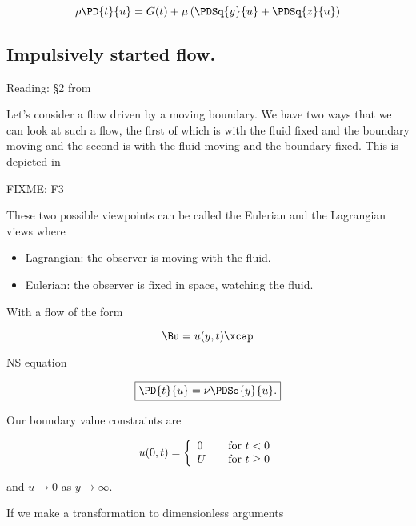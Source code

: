 \begin{equation}\label{eqn:continuumL16:210}
\rho \PD{t}{u} = G(t) + \mu \left( \PDSq{y}{u} +\PDSq{z}{u} \right)
\end{equation}

\subsection{Impulsively started flow.}

Reading: \S 2 from \cite{acheson1990elementary}

Let's consider a flow driven by a moving boundary.  We have two ways that we can look at such a flow, the first of which is with the fluid fixed and the boundary moving and the second is with the fluid moving and the boundary fixed.  This is depicted in

FIXME: F3

These two possible viewpoints can be called the Eulerian and the Lagrangian views where

\begin{itemize}
\item Lagrangian: the observer is moving with the fluid.
\item Eulerian: the observer is fixed in space, watching the fluid.
\end{itemize}

With a flow of the form

\begin{equation}\label{eqn:continuumL16:230}
\Bu = u(y, t) \xcap
\end{equation}

NS equation

\begin{equation}\label{eqn:continuumL16:250}
\boxed{
\PD{t}{u} = \nu \PDSq{y}{u}.
}
\end{equation}

Our boundary value constraints are

\begin{equation}\label{eqn:continuumL16:270}
u(0, t) = 
\left\{
\begin{array}{l l}
0 & \quad \mbox{for $t < 0$} \\
U & \quad \mbox{for $t \ge 0$}
\end{array}
\right.
\end{equation}

and $u \rightarrow 0$ as $y \rightarrow \infty$.

If we make a transformation to dimensionless arguments


